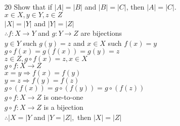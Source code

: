 \documentclass[a4paper]{article}
\newcommand\tab[1][0.5cm]{\hspace*{#1}}
\begin{document}
\begin{itemize}
    \item[20] Show that if $|A|=|B|$ and $|B|=|C|$, then $|A|=|C|$. \\
    \tab $x \in X, y \in Y, z \in Z$ \\
    \tab $|X| = |Y|$ and $|Y| = |Z|$ \\
    \tab $\therefore f: X \rightarrow Y$ and $g: Y \rightarrow Z$ are bijections \\
    \tab $y \in Y$ such $g(y) = z$ and $x \in X$ such $f(x) = y$ \\
    \tab $g \circ f(x) = g(f(x)) = g(y) = z$ \\
    \tab $z \in Z, g \circ f(x) = z, x \in X$ \\
    \tab $g \circ f: X \rightarrow Z$ \\
    \tab $x = y \Rightarrow f(x) = f(y)$ \\
    \tab $y = z \Rightarrow f(y) = f(z)$ \\
    \tab $g \circ (f(x)) = g \circ (f(y)) = g \circ (f(z))$ \\
    \tab $g \circ f: X \rightarrow Z$ is one-to-one \\
    \tab $g \circ f: X \rightarrow Z$ is a bijection \\
    \tab $\therefore |X = |Y$ and $|Y = |Z|,$ then $ |X| = |Z|$
  \end{itemize}
  
\end{document}
